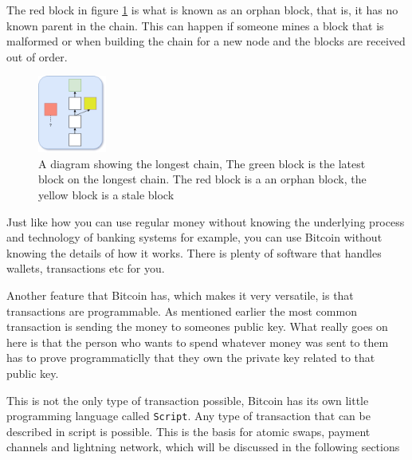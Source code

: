 The red block in figure \ref{fig:blockchain2} is what is known as an orphan
block, that is, it has no known parent in the chain. This can happen if someone
mines a block that is malformed or when building the chain for a new node and
the blocks are received out of order.

\begin{figure}[H]
	\centering
	\includegraphics[width=0.2\textwidth]{introduction/images/more_blockchain.png}
	\caption{A diagram showing the longest chain, The green block is the latest
	block on the longest chain. The red block is a an orphan block, the yellow
	block is a stale block}
	\label{fig:blockchain2}
\end{figure}


Just like how you can use regular money without knowing the underlying process
and technology of banking systems for example, you can use Bitcoin without
knowing the details of how it works. There is plenty of software that handles
wallets, transactions etc for you.


Another feature that Bitcoin has, which makes it very versatile, is that transactions are programmable.
As mentioned earlier the most
common transaction is sending the money to someones public key. What really
goes on here is that the person who wants to spend whatever money was sent to
them has to prove programmaticlly that they own the private key related to that
public key.

This is not the only type of transaction possible, Bitcoin has its own little
programming language called \texttt{Script}. Any type of transaction that can
be described in script is possible. This is the basis for atomic swaps, payment
channels and lightning network, which will be discussed in the following sections
